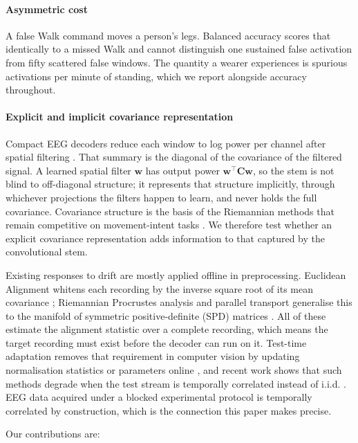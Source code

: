 \documentclass[a4paper,fleqn]{cas-dc}
\begin{document}
\paragraph{Asymmetric cost} A false Walk command moves a person's legs. Balanced
accuracy scores that identically to a missed Walk and cannot distinguish one
sustained false activation from fifty scattered false windows. The quantity a
wearer experiences is spurious activations per minute of standing, which we
report alongside accuracy throughout.

\paragraph{Explicit and implicit covariance representation} Compact EEG decoders reduce each window to log power per channel after spatial filtering \citep{schirrmeister,lawhern}. That summary is the diagonal of the covariance of the filtered signal. A learned spatial filter $\mathbf{w}$ has output power $\mathbf{w}^\top \mathbf{C}\mathbf{w}$, so the stem is not blind to off-diagonal structure; it represents that structure implicitly, through whichever projections the filters happen to learn, and never holds the full covariance. Covariance structure is the basis of the Riemannian methods that remain competitive on movement-intent tasks \citep{barachant,congedo}. We therefore test whether an explicit covariance representation adds information to that captured by the convolutional stem.

Existing responses to drift are mostly applied offline in preprocessing.
Euclidean Alignment whitens each recording by the inverse square root of its
mean covariance \citep{hewu}; Riemannian Procrustes analysis and parallel
transport generalise this to the manifold of symmetric positive-definite (SPD)
matrices \citep{rodrigues,yair,zanini}. All of these estimate the alignment
statistic over a complete recording, which means the target recording must exist
before the decoder can run on it. Test-time adaptation removes that requirement
in computer vision by updating normalisation statistics or parameters online
\citep{tent,schneider,nado}, and recent work shows that such methods degrade
when the test stream is temporally correlated instead of i.i.d.
\citep{note,sar,cotta}. EEG data acquired under a blocked experimental protocol
is temporally correlated by construction, which is the connection this paper
makes precise.

Our contributions are:
\end{document}

